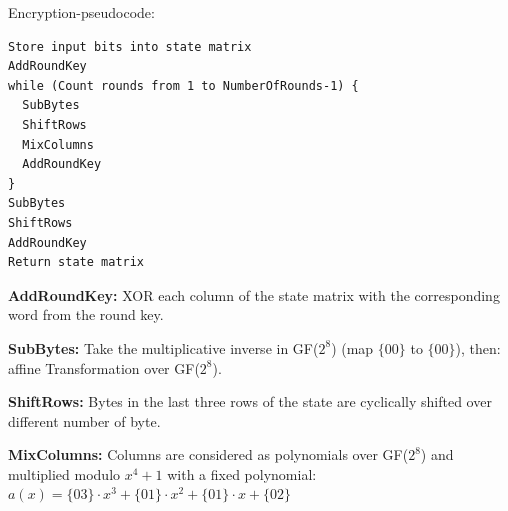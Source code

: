 \begin{multicols}{2}
Encryption-pseudocode:
\begin{verbatim}
Store input bits into state matrix
AddRoundKey
while (Count rounds from 1 to NumberOfRounds-1) {
  SubBytes
  ShiftRows
  MixColumns
  AddRoundKey
}
SubBytes
ShiftRows
AddRoundKey
Return state matrix
\end{verbatim}

\textbf{AddRoundKey:}
XOR each column of the state matrix with the corresponding word from the round key.

\textbf{SubBytes:}
Take the multiplicative inverse in GF($2^8$) (map $\{00\}$ to $\{00\}$), then: affine Transformation over GF($2^8$).

\textbf{ShiftRows:}
Bytes in the last three rows of the state are cyclically shifted over different number of byte.

\textbf{MixColumns:}
Columns are considered as polynomials over GF($2^8$) and multiplied modulo $x^4+1$ with a fixed polynomial: $a(x) = \{03\} \cdot x^3 + \{01\} \cdot x^2 + \{01\} \cdot x + \{02\}$
\end{multicols}

